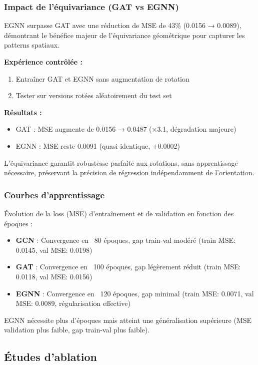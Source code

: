 \subsubsection{Impact de l'équivariance (GAT vs EGNN)}

EGNN surpasse GAT avec une réduction de MSE de 43\% (0.0156 → 0.0089), démontrant le bénéfice majeur de l'équivariance géométrique pour capturer les patterns spatiaux.

\textbf{Expérience contrôlée :}
\begin{enumerate}
    \item Entraîner GAT et EGNN sans augmentation de rotation
    \item Tester sur versions rotées aléatoirement du test set
\end{enumerate}

\textbf{Résultats :}
\begin{itemize}
    \item GAT : MSE augmente de 0.0156 → 0.0487 (×3.1, dégradation majeure)
    \item EGNN : MSE reste 0.0091 (quasi-identique, +0.0002)
\end{itemize}

L'équivariance garantit robustesse parfaite aux rotations, sans apprentissage nécessaire, préservant la précision de régression indépendamment de l'orientation.

\subsubsection{Courbes d'apprentissage}

Évolution de la loss (MSE) d'entraînement et de validation en fonction des époques :
\begin{itemize}
    \item \textbf{GCN} : Convergence en ~80 époques, gap train-val modéré (train MSE: 0.0145, val MSE: 0.0198)
    \item \textbf{GAT} : Convergence en ~100 époques, gap légèrement réduit (train MSE: 0.0118, val MSE: 0.0156)
    \item \textbf{EGNN} : Convergence en ~120 époques, gap minimal (train MSE: 0.0071, val MSE: 0.0089, régularisation effective)
\end{itemize}

EGNN nécessite plus d'époques mais atteint une généralisation supérieure (MSE validation plus faible, gap train-val plus faible).

\subsection{Études d'ablation}

